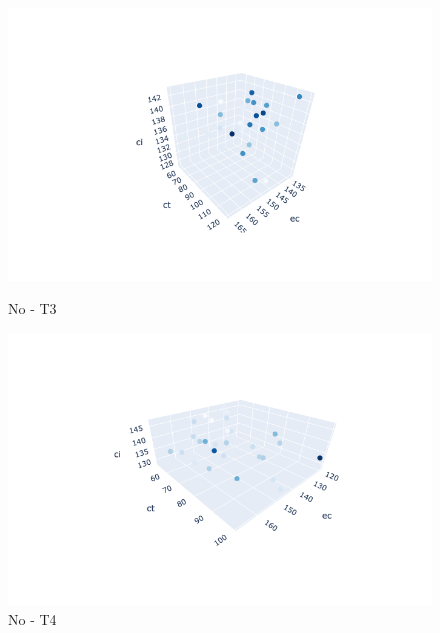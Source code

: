 \documentclass{hust}
\begin{document}
\begin{itemize}
	\begin{figure}[H]
		\begin{minipage}{0.5\textwidth}
			\centering
			\includegraphics[width=1.2\linewidth]{images/no-dem3.png}
			\caption{No - T3}\label{fig:nsga-ii-no-dem3}
		\end{minipage}\hfill
		\begin{minipage}{0.5\textwidth}
			\centering
			\includegraphics[width=1.2\linewidth]{images/no-dem4.png}
			\caption{No - T4}\label{fig:nsga-ii-no-dem4}
		\end{minipage}
	\end{figure}
	

\end{itemize}
\end{document}
